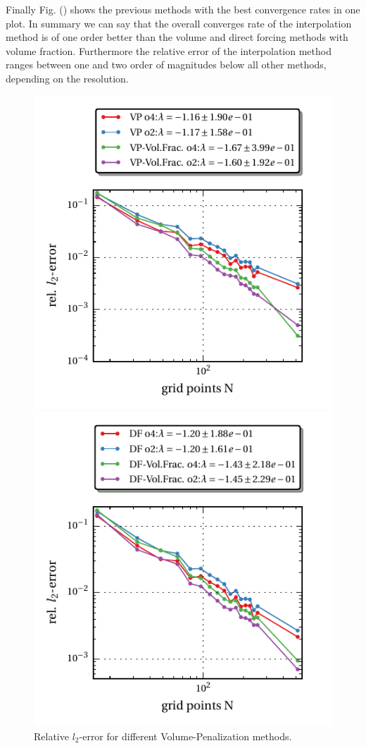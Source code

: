 Finally Fig. () shows the previous methods with the best convergence rates in one plot.
In summary we can say that the overall converges rate of the interpolation method is of one order better
than the volume and direct forcing methods with volume fraction. Furthermore the relative error of the interpolation method ranges
between one and two order of magnitudes below all other methods, depending on the resolution.


\clearpage
\begin{figure}[!bp]
  \begin{minipage}[c]{0.5\textwidth}
      \includegraphics{gfx/immersed_boundary/hpflow/theo/vp.pdf}
      \caption{Relative $l_2$-error for different Volume-Penalization methods.}
  \end{minipage}
  \begin{minipage}[c]{0.5\textwidth}
      \includegraphics{gfx/immersed_boundary/hpflow/theo/df.pdf}

\end{minipage}
\end{figure}
